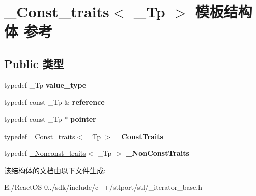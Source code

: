 \hypertarget{struct___const__traits}{}\section{\+\_\+\+Const\+\_\+traits$<$ \+\_\+\+Tp $>$ 模板结构体 参考}
\label{struct___const__traits}
\subsection*{Public 类型}
\begin{DoxyCompactItemize}
\item 
\mbox{\label{struct___const__traits_a1ec2e174c59d47d0ee54e9c47c804c47}} 
typedef \+\_\+\+Tp {\bfseries value\+\_\+type}
\item 
\mbox{\label{struct___const__traits_a4cffe603b32e272ba1bbe607b56d3a03}} 
typedef const \+\_\+\+Tp \& {\bfseries reference}
\item 
\mbox{\label{struct___const__traits_ac74b2a5dff0a5c1878a1545f168c28b1}} 
typedef const \+\_\+\+Tp $\ast$ {\bfseries pointer}
\item 
\mbox{\label{struct___const__traits_a418d321d665d5afe1b409241eb0fcb62}} 
typedef \hyperlink{struct___const__traits}{\+\_\+\+Const\+\_\+traits}$<$ \+\_\+\+Tp $>$ {\bfseries \+\_\+\+Const\+Traits}
\item 
\mbox{\label{struct___const__traits_a6a0c38354780c7972adae7c6d67a5758}} 
typedef \hyperlink{struct___nonconst__traits}{\+\_\+\+Nonconst\+\_\+traits}$<$ \+\_\+\+Tp $>$ {\bfseries \+\_\+\+Non\+Const\+Traits}
\end{DoxyCompactItemize}


该结构体的文档由以下文件生成\+:\begin{DoxyCompactItemize}
\item 
E\+:/\+React\+O\+S-\/0../sdk/include/c++/stlport/stl/\+\_\+iterator\+\_\+base.\+h\end{DoxyCompactItemize}
